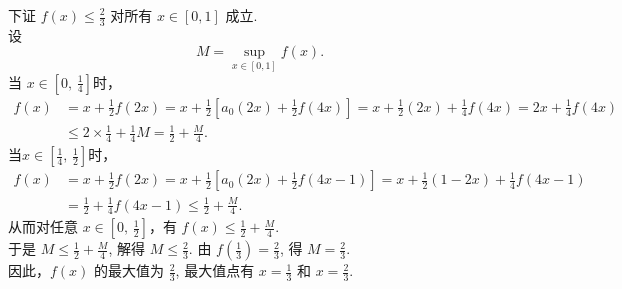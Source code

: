 \begin{solution}
\begin{enumerate}[leftmargin=*,label=\arabic*.]
    下证 \(\displaystyle f(x) \leq \frac{2}{3} \) 对所有 \( x \in [0,1] \) 成立.\\
    设 
    \[
    M = \sup_{x\in[0,1]} f(x).
    \]
    当 $\displaystyle x\in\left[0,\,\frac{1}{4}\right]$时，
    \[
    \begin{aligned}
    f(x)&=x+\frac{1}{2}f(2x)=x+\frac{1}{2}\left[a_0(2x)+\frac{1}{2}f(4x)\right]=x+\frac{1}{2}(2x)+\frac{1}{4}f(4x)=2x+\frac{1}{4}f(4x)\\&
    \leq 2\times \frac{1}{4}+\frac{1}{4}M=\frac{1}{2}+\frac{M}{4}.
    \end{aligned}
    \]
    当$\displaystyle x\in\left[\frac{1}{4},\,\frac{1}{2}\right]$时，
    \[
    \begin{aligned}
    f(x)&=x+\frac{1}{2}f(2x)=x+\frac{1}{2}\left[a_0(2x)+\frac{1}{2}f(4x-1)\right]=x+\frac{1}{2}(1-2x)+\frac{1}{4}f(4x-1)\\
    &=\frac{1}{2}+\frac{1}{4}f(4x-1)\leq \frac{1}{2}+\frac{M}{4}.
    \end{aligned}
    \]
    从而对任意 $\displaystyle x\in\left[0,\,\frac{1}{2}\right]$，有 $\displaystyle f(x)\leq \frac{1}{2}+\frac{M}{4}$.\\
    于是 \(\displaystyle M \leq \frac{1}{2} + \frac{M}{4} \), 解得 \(\displaystyle M \leq \frac{2}{3} \). 
    由 \(\displaystyle f(\frac{1}{3})=\frac{2}{3} \), 得 \(\displaystyle M=\frac{2}{3} \).\\
    因此，\( f(x) \) 的最大值为 \(\displaystyle \frac{2}{3} \), 最大值点有 \(\displaystyle x=\frac{1}{3} \) 和 \(\displaystyle x=\frac{2}{3} \).
    \end{enumerate}
\end{solution}